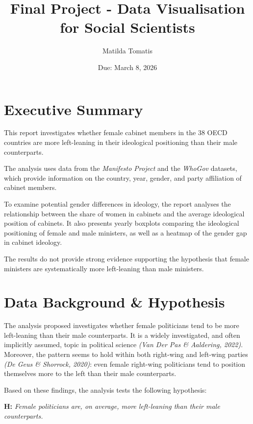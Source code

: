 \documentclass[12pt,letterpaper]{article}
\title{Final Project - Data Visualisation for Social Scientists}
\date{Due: March 8, 2026}
\author{Matilda Tomatis}
\begin{document}
	
	\maketitle
	\tableofcontents
	\newpage
	
	\section{Executive Summary}
	
\vspace{0.5cm}
	
\noindent This report investigates whether female cabinet members in the 38 OECD countries are more left-leaning in their ideological positioning than their male counterparts.

\noindent The analysis uses data from the \emph{Manifesto Project} and the \emph{WhoGov} datasets, which provide information on the country, year, gender, and party affiliation of cabinet members.

\noindent To examine potential gender differences in ideology, the report analyses the relationship between the share of women in cabinets and the average ideological position of cabinets. It also presents yearly boxplots comparing the ideological positioning of female and male ministers, as well as a heatmap of the gender gap in cabinet ideology.

\noindent The results do not provide strong evidence supporting the hypothesis that female ministers are systematically more left-leaning than male ministers.

\vspace{0.5cm}
	
	\section{Data Background \& Hypothesis}
	
\vspace{1cm}

\noindent The analysis proposed investigates whether female politicians tend to be more left-leaning than their male counterparts. It is a widely investigated, and often implicitly assumed, topic in political science \emph{(Van Der Pas \& Aaldering, 2022)}. Moreover, the pattern seems to hold within both right-wing and left-wing parties \emph{(De Geus \& Shorrock, 2020)}: even female right-wing politicians tend to position themselves more to the left than their male counterparts.

\noindent Based on these findings, the analysis tests the following hypothesis: 
\begin{center}
	\textbf{H:} \textit{Female politicians are, on average, more left-leaning than their male counterparts.}
\end{center}
\end{document}
